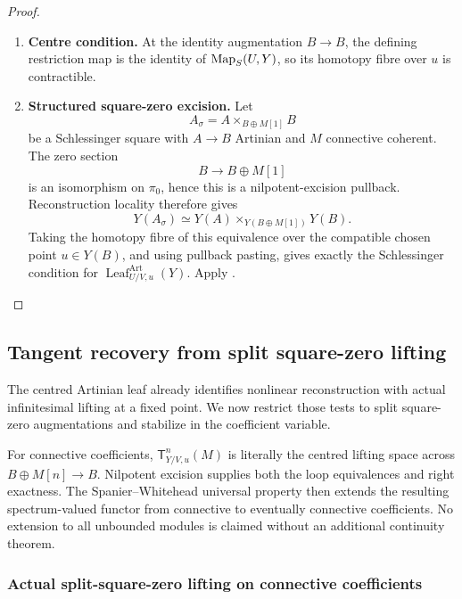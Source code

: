 \begin{proof}
\leavevmode
\begin{enumerate}[label=\textup{(\arabic*)}]
    \item \textbf{Centre condition.}
    At the identity augmentation \(B\to B\), the defining restriction map is the
    identity of \(\operatorname{Map}_S(U,Y)\), so its homotopy fibre over \(u\) is contractible.
    \item \textbf{Structured square-zero excision.}
    Let
    \[
        A_\sigma
        =
        A\times_{B\oplus M[1]}B
    \]
    be a Schlessinger square with \(A\to B\) Artinian and \(M\) connective
    coherent. The zero section
    \[
        B\longrightarrow B\oplus M[1]
    \]
    is an isomorphism on \(\pi_0\), hence this is a nilpotent-excision pullback.
    Reconstruction locality therefore gives
    \[
        Y(A_\sigma)
        \simeq
        Y(A)
        \times_{Y(B\oplus M[1])}
        Y(B).
    \]
    Taking the homotopy fibre of this equivalence over the compatible chosen point
    \(u\in Y(B)\), and using pullback pasting, gives exactly the Schlessinger
    condition for \(\operatorname{Leaf}^{\mathrm{Art}}_{U/V,u}(Y)\). Apply
    .
\end{enumerate}
\end{proof}



\subsection{Tangent recovery from split square-zero lifting}
\label{sec:reconstruction-tangent-semantics}


The centred Artinian leaf already identifies nonlinear reconstruction with actual
infinitesimal lifting at a fixed point. We now restrict those tests to split square-zero
augmentations and stabilize in the coefficient variable.

For connective coefficients, \(\mathsf T^n_{Y/V,u}(M)\) is literally the centred lifting
space across \(B\oplus M[n]\to B\). Nilpotent excision supplies both the loop
equivalences and right exactness. The Spanier--Whitehead universal property then extends
the resulting spectrum-valued functor from connective to eventually connective
coefficients. No extension to all unbounded modules is claimed without an additional
continuity theorem.

\subsubsection{Actual split-square-zero lifting on connective coefficients}

